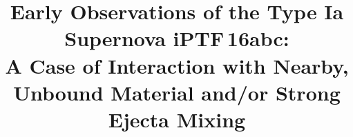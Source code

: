 \documentclass[twocolumn]{aastex61}
\newcommand{\abc}{iPTF\,16abc}
\begin{document}
\title{Early Observations of the Type Ia Supernova \abc:\\
A Case of Interaction with Nearby, Unbound Material and/or Strong Ejecta Mixing}


\end{document}
